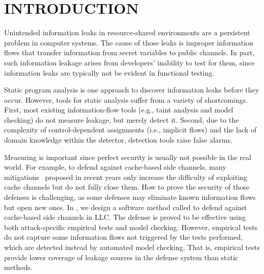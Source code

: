 \chapter{\uppercase{Introduction}}
\label{chap:intro}
Unintended information leaks in resource-shared environments are a
persistent problem in computer systems. The cause of those leaks is
improper information flows that transfer information from secret
variables to public channels. In part, such information leakage arises
from developers' inability to test for them, since information leaks
are typically not be evident in functional testing.

Static program analysis is one approach to discover
information leaks before they occur. However, tools for static
analysis suffer from a variety of shortcomings. First, most existing
information-flow tools (e.g., taint analysis and model checking) do
not measure leakage, but merely detect it.  Second, due to the
complexity of control-dependent assignments (i.e., implicit flows) and
the lack of domain knowledge within the detector, detection tools
raise false alarms.

\iffalse
First, a false alarm,
caused by the complexity of control-dependent assignments (i.e.,
implicit flows) and the lack of domain knowledge within the detector,
can limit the tool's utility.  Second, most existing information-flow
tools (e.g., taint analysis and model checking) merely detect leaks
instead of measuring them.
\fi

Measuring is important since perfect security is usually not possible
in the real world. For example, to defend against cache-based side
channels, many mitigations~\cite{cachebar,scatterCache,phantomCache}
proposed in recent years only increase the difficulty of exploiting
cache channels but do not fully close them.
How to prove the
security of those defenses is challenging, as some defenses may
eliminate known information flows but open new ones. In
, we design a software method called \cachebar
to defend against cache-based side channels in \gls{LLC}. The defense
is proved to be effective using both attack-specific empirical
tests and model checking. However, empirical tests do not
capture some information flows not triggered by the tests performed,
which are detected instead by automated model checking. That is,
empirical tests provide lower coverage of leakage sources in the
defense system than static methods.

